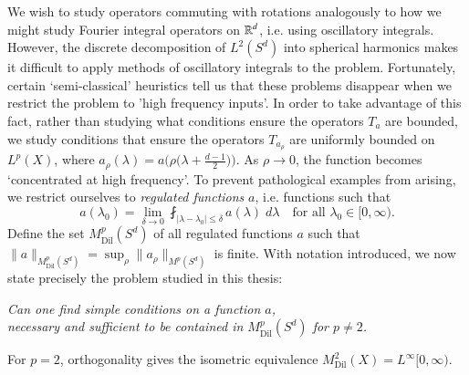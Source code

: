 We wish to study operators commuting with rotations analogously to how we might study Fourier integral operators on $\operatorname{\mathbb{R}}^d$, i.e. using oscillatory integrals. However, the discrete decomposition of $L^2(S^d)$ into spherical harmonics makes it difficult to apply methods of oscillatory integrals to the problem. Fortunately, certain `semi-classical' heuristics tell us that these problems disappear when we restrict the problem to 'high frequency inputs'. In order to take advantage of this fact, rather than studying what conditions ensure the operators $T_a$ are bounded, we study conditions that ensure the operators $T_{a_\rho}$ are uniformly bounded on $L^p(X)$, where $a_\rho(\lambda) = a \big( \rho \big(\lambda + \tfrac{d-1}{2} \big) \big)$. As $\rho \to 0$, the function becomes `concentrated at high frequency'. %
To prevent pathological examples from arising, we restrict ourselves to \emph{regulated functions} $a$, i.e. functions such that
%
%
\begin{equation}
  a(\lambda_0) = \lim_{\delta \to 0} \fint_{|\lambda - \lambda_0| \leq \delta} a(\lambda)\; d\lambda \quad \text{for all $\lambda_0 \in [0,\infty)$}.
\end{equation}
%
%
%
Define the set $M^p_{\text{Dil}}(S^d)$ of all regulated functions $a$ such that $\| a \|_{M^p_{\text{Dil}}(S^d)} = \sup_\rho \| a_\rho \|_{M^p(S^d)}$ is finite. With notation introduced, we now state precisely the problem studied in this thesis:
\begin{changemargin}{2cm}{2cm}
\begin{center}
  \emph{Can one find simple conditions on a function $a$,\\
  necessary and sufficient to be contained in $M^p_{\text{Dil}}(S^d)$ for $p \neq 2$.}
\end{center}
\end{changemargin}
%
For $p = 2$, orthogonality gives the isometric equivalence $M^2_{\text{Dil}}(X) = L^\infty[0,\infty)$.

